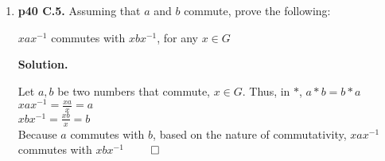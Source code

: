 \documentclass[11pt]{article}
\begin{document}
\begin{enumerate}
\item {\bfseries p40 C.5.}
  Assuming that $a$ and $b$ commute, prove the following:
  
  $xax^{-1}$ commutes with $xbx^{-1}$, for any $x \in G$
  
  {\bfseries Solution.}
  
  Let $a,b$ be two numbers that commute, $x \in G$. Thus, in $*$, $a*b = b*a$\\
  $xax^{-1} = \frac{xa}{x} = a$\\
  $xbx^{-1} = \frac{xb}{x} = b$\\
  Because $a$ commutes with $b$, based on the nature of commutativity, $xax^{-1}$ commutes with $xbx^{-1}$ $\qed$\\


\end{enumerate}
\end{document}
